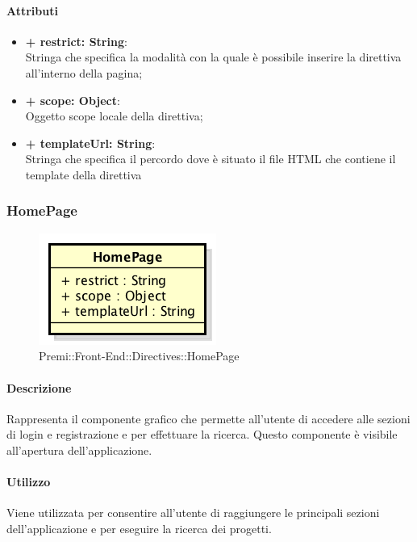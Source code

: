 	\paragraph{Attributi}
	\begin{itemize}
		\item \textbf{+ restrict: String}:\\
		Stringa che specifica la modalità con la quale è possibile inserire la direttiva all'interno della pagina;
		\item \textbf{+ scope: Object}:\\
		Oggetto scope locale della direttiva;
		\item \textbf{+ templateUrl: String}:\\
		Stringa che specifica il percordo dove è situato il file \gls{HTML} che contiene il \gls{template} della direttiva
	\end{itemize}
\newpage


\subsubsection{HomePage}
	\begin{figure}[h]
		\centering
		\includegraphics[width=0.5\linewidth]{img/premi_front_end_directives_homepage}
		\caption[Premi::Front-End::Directives::HomePage]{Premi::Front-End::Directives::HomePage}
	\end{figure}
	
	\paragraph{Descrizione}
	Rappresenta il componente grafico che permette all'utente di accedere alle sezioni di login e registrazione e per effettuare la ricerca. Questo componente è visibile all'apertura dell'applicazione.
	
	\paragraph{Utilizzo}
	Viene utilizzata per consentire all'utente di raggiungere le principali sezioni dell'applicazione e per eseguire la ricerca dei progetti.
		
